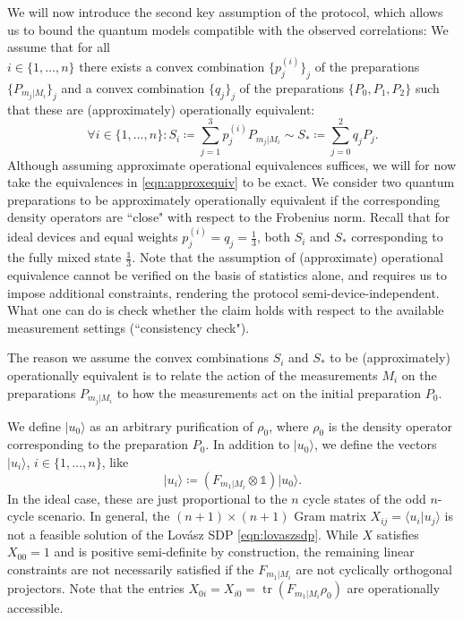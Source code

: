 We will now introduce the second key assumption of the protocol, which allows us to bound the quantum models compatible with the observed correlations: We assume that for all \\$i\in\{1,\dots,n\}$ there exists a convex combination $\{p_j^{(i)}\}_j$ of the preparations $\{P_{m_j\vert M_i}\}_j$ and a convex combination $\{q_j\}_j$ of the preparations $\{P_0,P_1,P_2\}$ such that these are (approximately) operationally equivalent:
\begin{equation}
\label{eqn:approxequiv}
\forall i\in\{1,\dots,n\}: S_i \coloneqq \sum_{j=1}^3 p_j^{(i)}P_{m_j\vert M_i} \sim S_* \coloneqq \sum_{j=0}^2 q_j P_j.
\end{equation}
Although assuming approximate operational equivalences suffices, we will for now take the equivalences in \ref{eqn:approxequiv} to be exact. We consider two quantum preparations to be approximately operationally equivalent if the corresponding density operators are ``close" with respect to the Frobenius norm. Recall that for ideal devices and equal weights $p_j^{(i)}=q_j=\frac{1}{3}$, both $S_i$ and $S_{*}$ corresponding to the fully mixed state $\frac{\mathbb{1}}{3}$. Note that the assumption of (approximate) operational equivalence cannot be verified on the basis of statistics alone, and requires us to impose additional constraints, rendering the protocol semi-device-independent. What one can do is check whether the claim holds with respect to the available measurement settings (``consistency check").  

The reason we assume the convex combinations $S_i$ and $S_{*}$ to be (approximately) operationally equivalent is to relate the action of the measurements $M_i$ on the preparations $P_{m_j\vert M_i}$ to how the measurements act on the initial preparation $P_0$.

We define $\vert u_0 \rangle$ as an arbitrary purification of $\rho_0$, where $\rho_0$ is the density operator corresponding to the preparation $P_0$. In addition to $\vert u_0 \rangle$, we define the vectors $\vert u_i \rangle$, $i \in \{1,\dots,n\}$, like
\begin{equation}
\label{eqn:gramvectors}
\vert u_i \rangle \coloneqq (F_{m_1\vert M_i}\otimes\mathbb{1})\vert u_0 \rangle.
\end{equation}
In the ideal case, these are just proportional to the $n$ cycle states of the odd $n$-cycle scenario. In general, the $(n+1)\times(n+1)$ Gram matrix $X_{ij}=\langle u_i \vert u_j \rangle$ is not a feasible solution of the Lovász SDP \ref{eqn:lovaszsdp}. While $X$ satisfies $X_{00}=1$ and is positive semi-definite by construction, the remaining linear constraints are not necessarily satisfied if the $F_{m_1\vert M_i}$ are not cyclically orthogonal projectors. Note that the entries $X_{0i}=X_{i0}=\operatorname{tr}(F_{m_1\vert M_i} \rho_0)$ are operationally accessible. 

